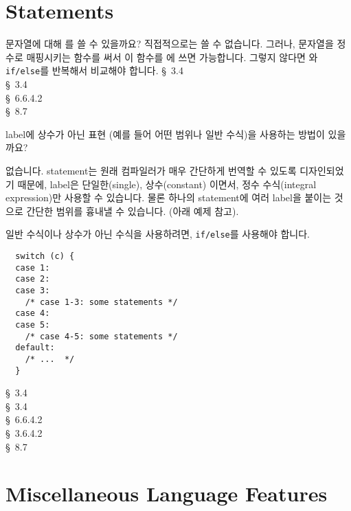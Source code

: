 \section{ Statements}	\label{sec:switch}

\begin{faq}
	문자열에 대해 를 쓸 수 있을까요?
\A
	직접적으로는 쓸 수 없습니다.  그러나, 문자열을 정수로 매핑시키는
	함수를 써서 이 함수를 에 쓰면 가능합니다.
	그렇지 않다면 와 \verb+if/else+를 반복해서
	비교해야 합니다.  
\R
	\cite{kr1} \S\ 3.4  \\
	\cite{kr2} \S\ 3.4  \\
	\cite{c89} \S\ 6.6.4.2 \\
	\cite{hs} \S\ 8.7 
\end{faq}

\begin{faq}
	 label에 상수가 아닌 표현 (예를 들어 어떤 범위나
        일반 수식)을 사용하는 방법이 있을까요?

\A
	없습니다.   statement는 원래 컴파일러가 매우 간단하게
	번역할 수 있도록 디자인되었기 때문에,  label은
	단일한(single), 상수(constant) 이면서, 정수 수식(integral expression)만
	사용할 수 있습니다.  물론 하나의 statement에 여러 
	label을 붙이는 것으로 간단한 범위를 흉내낼 수 있습니다.  (아래 예제
	참고).

	일반 수식이나 상수가 아닌 수식을 사용하려면, \verb+if/else+를
	사용해야 합니다.

\T
\begin{verbatim}
  switch (c) {
  case 1:
  case 2:
  case 3:
    /* case 1-3: some statements */
  case 4:
  case 5:
    /* case 4-5: some statements */
  default:
    /* ...  */
  }
\end{verbatim}
\R
	\cite{kr1} \S\ 3.4  \\
	\cite{kr2} \S\ 3.4  \\
	\cite{c89} \S\ 6.6.4.2 \\
	\cite{rationale} \S\ 3.6.4.2 \\
	\cite{hs} \S\ 8.7 
\end{faq}

\section{Miscellaneous Language Features}	\label{sec:misclangfeature}

